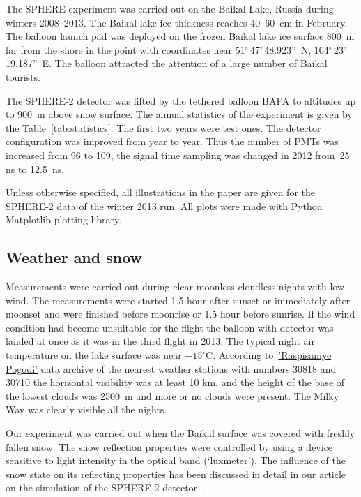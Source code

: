 \documentclass[final,5p,times,twocolumn]{elsarticle}
\begin{document}
The SPHERE experiment was carried out on the Baikal Lake, Russia during winters 2008--2013. The Baikal lake ice thickness reaches 40--60~cm in February. The balloon launch pad was deployed on the frozen Baikal lake ice surface 800~m far from the shore in the point with coordinates near 51$^\circ$\,47'\,48.923''~N, 104$^\circ$\,23'\,19.187''~E. 
The balloon attracted the attention of a large number of Baikal tourists. 

The \mbox{SPHERE-2} detector was lifted by the tethered balloon BAPA to altitudes up to 900~m above snow surface. The annual statistics of the experiment is given by the Table~\ref{tab:statistics}. The first two years were test ones. The detector configuration was improved from year to year. Thus the number of PMTs was increased from 96 to 109, the signal time sampling was changed in 2012 from~25 ns to 12.5~ns.

Unless otherwise specified, all illustrations in the paper are given for the \mbox{SPHERE-2} data of the winter 2013 run. All plots were made with Python Matplotlib plotting library.


\subsection{Weather and snow}

Measurements were carried out during clear moonless cloudless nights with low wind. The measurements were started 1.5 hour after sunset or immediately after moonset and were finished before moonrise or 1.5 hour before sunrise. If the wind condition had become unsuitable for the flight the balloon with detector was landed at once as it was in the third flight in 2013. The typical night air temperature on the lake surface was near $-15^\circ$C. According to~\href{https://rp5.ru/}{'Raspisaniye Pogodi'} data archive of the nearest weather stations with numbers 30818 and 30710 the horizontal visibility was at least 10 km, and the height of the base of the lowest clouds was 2500~m and more or no clouds were present. The Milky Way was clearly visible all the nights.

Our experiment was carried out when the Baikal surface was covered with freshly fallen snow. The snow reflection properties were controlled by using a device sensitive to light intensity in the optical band (`luxmeter'). The influence of the snow state on its reflecting properties has been discussed in detail in our article on the simulation of the SPHERE-2 detector~\cite{Ant19}. 
\end{document}
